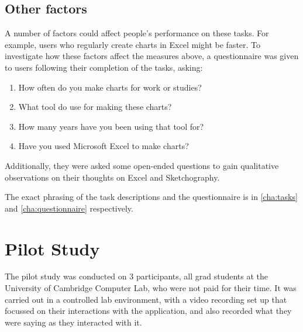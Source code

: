 \subsection*{Other factors}
A number of factors could affect people's performance on these tasks. For example, users who regularly create charts in Excel might be faster. To investigate how these factors affect the measures above, a questionnaire was given to users following their completion of the tasks, asking:

\begin{enumerate}
\item How often do you make charts for work or studies?
\item What tool do use for making these charts?
\item How many years have you been using that tool for?
\item Have you used Microsoft Excel to make charts?
\end{enumerate}

Additionally, they were asked some open-ended questions to gain qualitative observations on their thoughts on Excel and Sketchography.

The exact phrasing of the task descriptions and the questionnaire is in \autoref{cha:tasks} and \autoref{cha:questionnaire} respectively.


\section{Pilot Study}
The pilot study was conducted on 3 participants, all grad students at the University of Cambridge Computer Lab, who were not paid for their time. It was carried out in a controlled lab environment, with a video recording set up that focussed on their interactions with the application, and also recorded what they were saying as they interacted with it.

